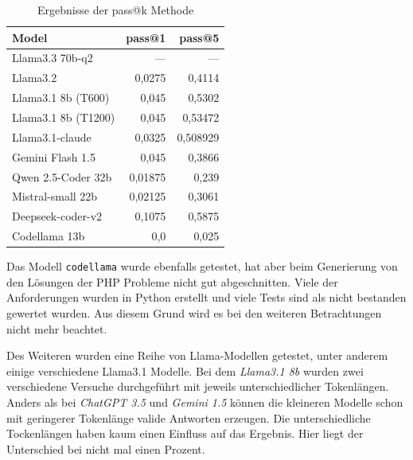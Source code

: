 \begin{table}[!ht]
	\begin{tabular}{|l|r|r|}
		\hline
		\textbf{Model} & \textbf{pass@1} & \textbf{pass@5} \\
		\hline
		Llama3.3 70b-q2      &     --- &      --- \\
		Llama3.2             &  0,0275 &   0,4114 \\
		Llama3.1 8b (T600)   &   0,045 &   0,5302 \\
		Llama3.1 8b (T1200)  &   0,045 &  0,53472 \\
		Llama3.1-claude      &  0,0325 & 0,508929 \\
		Gemini Flash 1.5     &   0,045 &   0,3866 \\
		Qwen 2.5-Coder 32b   & 0,01875 &    0,239 \\
		Mistral-small 22b    & 0,02125 &   0,3061 \\
		Deepseek-coder-v2    &  0,1075 &   0,5875 \\
		Codellama 13b        &     0,0 &    0,025 \\
		\hline
	\end{tabular}
	\centering
	\label{tab:prompt_results_open_models}
	\caption{Ergebnisse der pass@k Methode}
\end{table}

Das Modell \texttt{codellama} wurde ebenfalls getestet, hat aber beim Generierung von den Lösungen der PHP Probleme nicht gut abgeschnitten. Viele der Anforderungen wurden in Python erstellt und viele Tests sind als nicht bestanden gewertet wurden. Aus diesem Grund wird es bei den weiteren Betrachtungen nicht mehr beachtet.\vspace{0.2cm}

Des Weiteren wurden eine Reihe von Llama-Modellen getestet, unter anderem einige verschiedene Llama3.1 Modelle. Bei dem \textit{Llama3.1 8b} wurden zwei verschiedene Versuche durchgeführt mit jeweils unterschiedlicher Tokenlängen. Anders als bei \textit{ChatGPT 3.5} und \textit{Gemini 1.5} können die kleineren Modelle schon mit geringerer Tokenlänge valide Antworten erzeugen. Die unterschiedliche Tockenlängen haben kaum einen Einfluss auf das Ergebnis. Hier liegt der Unterschied bei nicht mal einen Prozent.\vspace{0.2cm}

